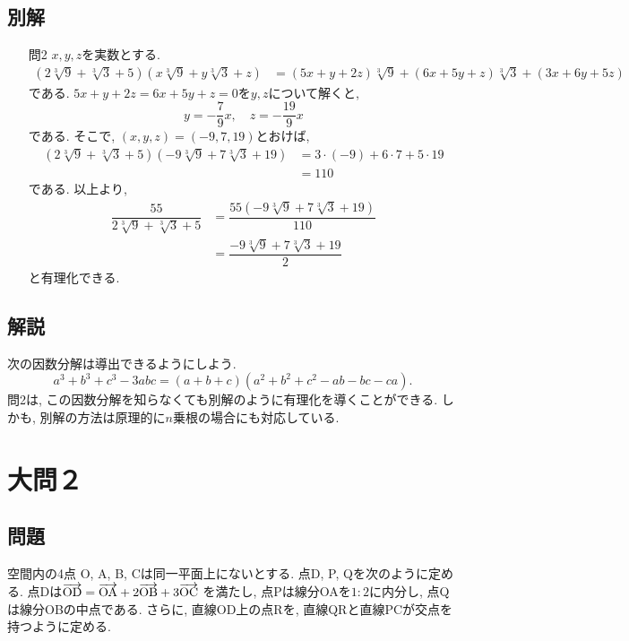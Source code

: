 \documentclass[dvipdfmx,a4paper]{jsarticle}
\begin{document}
    \subsection{別解}
    \begin{itemize}
        \item [問2] $x,y,z$を実数とする. 
        \begin{align*}
            (2 \sqrt[3]{9} + \sqrt[3]{3} + 5)(x \sqrt[3]{9} + y\sqrt[3]{3} + z) 
            &= (5x+y+2z)\sqrt[3]{9} + (6x + 5y + z)\sqrt[3]{3} + (3x + 6y + 5z)
        \end{align*}
        である. $5x+y+2z=6x + 5y + z=0$を$y,z$について解くと, 
        \begin{equation*}
            y = -\dfrac{7}{9}x, \quad z = - \dfrac{19}{9}x
        \end{equation*}
        である. そこで, $(x,y,z)=(-9,7,19)$とおけば, 
        \begin{align*}
            (2 \sqrt[3]{9} + \sqrt[3]{3} + 5)(-9 \sqrt[3]{9} + 7\sqrt[3]{3} + 19) 
            &= 3\cdot (-9) + 6\cdot 7 + 5 \cdot 19 \\
            &= 110
        \end{align*}
        である. 以上より, 
        \begin{align*}
            \dfrac{55}{2 \sqrt[3]{9} + \sqrt[3]{3} + 5}
            &= \dfrac{55(-9 \sqrt[3]{9} + 7 \sqrt[3]{3} + 19)}{110} \\
            &= \dfrac{-9 \sqrt[3]{9} + 7 \sqrt[3]{3} + 19}{2}
        \end{align*}
        と有理化できる. 
    \end{itemize}



    \subsection{解説}
    次の因数分解は導出できるようにしよう. 
    \[
        a^3 + b^3 + c^3 -3abc = (a + b +c)(a^2 + b^2 + c^2 - ab -bc -ca).
    \]
    問2は, この因数分解を知らなくても別解のように有理化を導くことができる. しかも, 
    別解の方法は原理的に$n$乗根の場合にも対応している. 
    
    \section{大問２}
    \subsection{問題}
    空間内の4点 O, A, B, Cは同一平面上にないとする. 点D, P, Qを次のように定める. 
    点Dは$\overrightarrow{\mathrm{OD}} = \overrightarrow{\mathrm{OA}} + 2\overrightarrow{\mathrm{OB}} + 3\overrightarrow{\mathrm{OC}}$ を満たし,   
    点Pは線分OAを$1 : 2$に内分し, 点Qは線分OBの中点である. さらに,   
    直線OD上の点Rを, 直線QRと直線PCが交点を持つように定める.   
\end{document}
